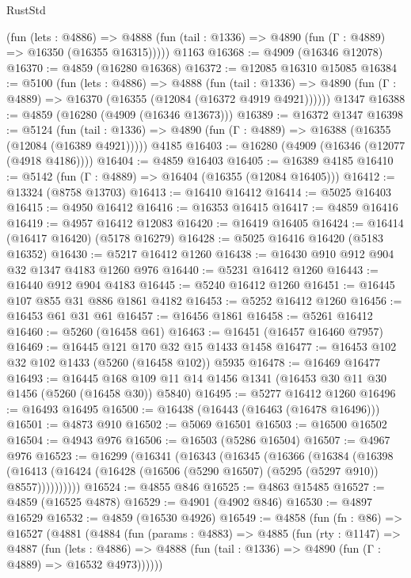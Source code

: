 \begin{lexlean}{RustStd}
\begin{coremodule}
      (fun (lets : @4886) =>
      @4888 (fun (tail : @1336) => @4890 (fun (Γ : @4889) => @16350 (@16355 @16315)))))
    @1163
@16368 := @4909 (@16346 @12078)
@16370 := @4859 (@16280 @16368)
@16372 := @12085 @16310 @15085
@16384 := @5100
    (fun (lets : @4886) =>
    @4888
      (fun (tail : @1336) =>
      @4890 (fun (Γ : @4889) => @16370 (@16355 (@12084 (@16372 @4919 @4921))))))
    @1347
@16388 := @4859 (@16280 (@4909 (@16346 @13673)))
@16389 := @16372 @1347
@16398 := @5124
    (fun (tail : @1336) => @4890 (fun (Γ : @4889) => @16388 (@16355 (@12084 (@16389 @4921)))))
    @4185
@16403 := @16280 (@4909 (@16346 (@12077 (@4918 @4186))))
@16404 := @4859 @16403
@16405 := @16389 @4185
@16410 := @5142 (fun (Γ : @4889) => @16404 (@16355 (@12084 @16405)))
@16412 := @13324 (@8758 @13703)
@16413 := @16410 @16412
@16414 := @5025 @16403
@16415 := @4950 @16412
@16416 := @16353 @16415
@16417 := @4859 @16416
@16419 := @4957 @16412 @12083
@16420 := @16419 @16405
@16424 := @16414 (@16417 @16420) (@5178 @16279)
@16428 := @5025 @16416 @16420 (@5183 @16352)
@16430 := @5217 @16412 @1260
@16438 := @16430 @910 @912 @904 @32 @1347 @4183 @1260 @976
@16440 := @5231 @16412 @1260
@16443 := @16440 @912 @904 @4183
@16445 := @5240 @16412 @1260
@16451 := @16445 @107 @855 @31 @886 @1861 @4182
@16453 := @5252 @16412 @1260
@16456 := @16453 @61 @31 @61
@16457 := @16456 @1861
@16458 := @5261 @16412
@16460 := @5260 (@16458 @61)
@16463 := @16451 (@16457 @16460 @7957)
@16469 := @16445 @121 @170 @32 @15 @1433 @1458
@16477 := @16453 @102 @32 @102 @1433 (@5260 (@16458 @102)) @5935
@16478 := @16469 @16477
@16493 := @16445 @168 @109 @11 @14 @1456 @1341 (@16453 @30 @11 @30 @1456 (@5260 (@16458 @30)) @5840)
@16495 := @5277 @16412 @1260
@16496 := @16493 @16495
@16500 := @16438 (@16443 (@16463 (@16478 @16496)))
@16501 := @4873 @910
@16502 := @5069 @16501
@16503 := @16500 @16502
@16504 := @4943 @976
@16506 := @16503 (@5286 @16504)
@16507 := @4967 @976
@16523 := @16299
    (@16341
      (@16343
        (@16345
          (@16366
            (@16384
              (@16398
                (@16413 (@16424 (@16428 (@16506 (@5290 @16507) (@5295 (@5297 @910)) @8557))))))))))
@16524 := @4855 @846
@16525 := @4863 @15485
@16527 := @4859 (@16525 @4878)
@16529 := @4901 (@4902 @846)
@16530 := @4897 @16529
@16532 := @4859 (@16530 @4926)
@16549 := @4858
    (fun (fn : @86) =>
    @16527
      (@4881
        (@4884
          (fun (params : @4883) =>
          @4885
            (fun (rty : @1147) =>
            @4887
              (fun (lets : @4886) =>
              @4888 (fun (tail : @1336) => @4890 (fun (Γ : @4889) => @16532 @4973))))))

\end{coremodule}
\end{lexlean}
